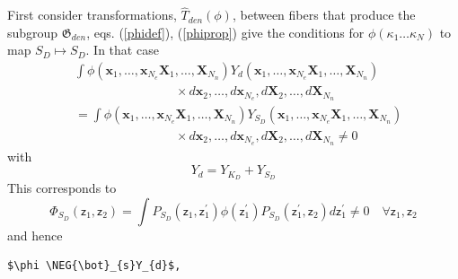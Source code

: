 \documentclass[aps,preprint]{revtex4}%
\begin{document}
First consider transformations, $\hat{T}_{den}\left(  \phi\right)  $, between
fibers that produce the subgroup $\mathfrak{G}_{den}$, eqs. (\ref{phidef}),
(\ref{phiprop}) give the conditions for $\phi(\kappa_{1}\ldots\kappa_{N})$ to
map $S_{D}\mapsto S_{D}$. In that case
\begin{align}
&  \int\phi(\mathbf{x}_{1},\ldots,\mathbf{x}_{N_{e}}\mathbf{X}_{1}%
,\ldots,\mathbf{X}_{N_{n}})Y_{d}(\mathbf{x}_{1},\ldots,\mathbf{x}_{N_{e}%
}\mathbf{X}_{1},\ldots,\mathbf{X}_{N_{n}})\nonumber\\
&  \qquad\qquad\qquad\qquad\times d\mathbf{x}_{2},\ldots,d\mathbf{x}_{N_{e}%
},d\mathbf{X}_{2},\ldots,d\mathbf{X}_{N_{n}}\nonumber\\
&  =\int\phi(\mathbf{x}_{1},\ldots,\mathbf{x}_{N_{e}}\mathbf{X}_{1}%
,\ldots,\mathbf{X}_{N_{n}})Y_{S_{D}}(\mathbf{x}_{1},\ldots,\mathbf{x}_{N_{e}%
}\mathbf{X}_{1},\ldots,\mathbf{X}_{N_{n}})\nonumber\\
&  \qquad\qquad\qquad\qquad\times d\mathbf{x}_{2},\ldots,d\mathbf{x}_{N_{e}%
},d\mathbf{X}_{2},\ldots,d\mathbf{X}_{N_{n}}\neq0
\end{align}
with%
\begin{equation}
Y_{d}=Y_{K_{D}}+Y_{S_{D}} \label{YKdYSd}%
\end{equation}
This corresponds to
\begin{equation}
\Phi_{S_{D}}\left(  \mathsf{z}_{1},\mathsf{z}_{2}\right)  =\int P_{S_{D}%
}\left(  \mathsf{z}_{1},\mathsf{z}_{1}^{\prime}\right)  \phi\left(
\mathsf{z}_{1}^{\prime}\right)  P_{S_{D}}\left(  \mathsf{z}_{1}^{\prime
},\mathsf{z}_{2}\right)  d\mathsf{z}_{1}^{\prime}\neq0\quad\forall
\mathsf{z}_{1},\mathsf{z}_{2} \label{projS}%
\end{equation}
and hence
\begin{verbatim}
$\phi \NEG{\bot}_{s}Y_{d}$,
\end{verbatim}
\end{document}
